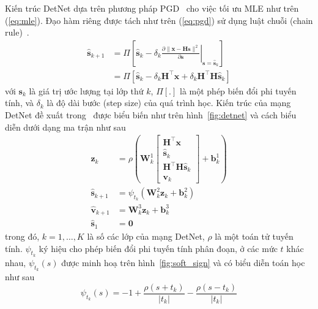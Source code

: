Kiến trúc DetNet dựa trên phương pháp PGD~\cite{Chen2015} cho việc tối ưu MLE như trên (\ref{eq:mle}). Đạo hàm riêng được tách như trên (\ref{eq:pgd}) sử dụng luật chuỗi (chain rule)~\cite{Minka2000}.
\begin{equation}
\label{eq:pgd}
    \begin{aligned}
    \hat{\mathbf{s}}_{k+1} & =\Pi\left[\hat{\mathbf{s}}_k-\left.\delta_k \frac{\partial\|\mathbf{x}-\mathbf{H} \mathbf{s}\|^2}{\partial \mathbf{s}}\right|_{\mathbf{s}=\hat{\mathbf{s}}_k}\right] \\
    & =\Pi\left[\hat{\mathbf{s}}_k-\delta_k \mathbf{H}^\top \mathbf{x}+\delta_k \mathbf{H}^\top \mathbf{H} \hat{\mathbf{s}}_k\right]
    \end{aligned}
\end{equation}
với $\mathbf{s}_k$ là giá trị ước lượng tại lớp thứ $k$, $\Pi [.]$ là một phép biến đổi phi tuyến tính, và $\delta_k$ là độ dài bước (step size) của quá trình học. Kiến trúc của mạng DetNet đề xuất trong~\cite{Samuel2017} được biểu biến như trên hình~\ref{fig:detnet} và cách biểu diễn dưới dạng ma trận như sau
\allowdisplaybreaks
\begin{subequations}
\begin{alignat}{4}
    \mathbf{z}_k & =\rho\left(\mathbf{W}^1_{k}\left[\begin{array}{c}
    \mathbf{H}^\top \mathbf{x} \\
    \hat{\mathbf{s}}_k \\
    \mathbf{H}^\top \mathbf{H} \hat{\mathbf{s}}_k \\
    \mathbf{v}_k
    \end{array}\right]+\mathbf{b}^1_{k}\right) \\
    \hat{\mathbf{s}}_{k+1} & =\psi_{t_k}\left(\mathbf{W}^2_{k} \mathbf{z}_k+ \mathbf{b}^2_{k}\right) \\
    \hat{\mathbf{v}}_{k+1} & =\mathbf{W}^3_{k} \mathbf{z}_k+ 
    \mathbf{b}^3_{k} \\
    \hat{\mathbf{s}}_1 & =\mathbf{0}
\end{alignat}
\end{subequations}
trong đó, $k = 1, \ldots, K$ là số các lớp của mạng DetNet, $\rho$ là một toán tử tuyến tính. $\psi_{t_k}$ ký hiệu cho phép biến đổi phi tuyến tính phân đoạn, ở các mức $t$ khác nhau, $\psi_{t_k}(s)$ được minh hoạ trên hình~\ref{fig:soft_sign} và có biểu diễn toán học như sau
\begin{equation}
    \psi_{t_k}(s)=-1+\frac{\rho\left(s + t_k \right)}{\left|t_k\right|}-\frac{\rho\left(s- t_k \right)}{\left|t_k\right|}
\end{equation}

